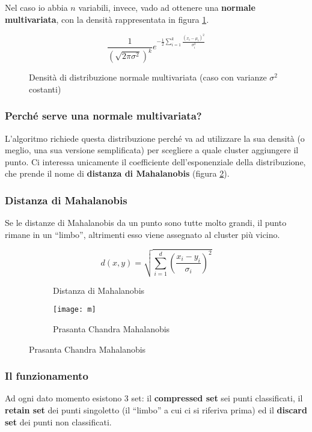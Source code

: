 \documentclass[\main/main.tex]{subfiles}
\begin{document}
Nel caso io abbia $n$ variabili, invece, vado ad ottenere una \textbf{normale multivariata}, con la densità rappresentata in figura \ref{fig:multivariata}.

\begin{figure}
  \[
    \frac{1}{(\sqrt{2 \pi \sigma^2})^k} e^{- \frac{1}{2} \sum_{i=1}^k \frac{(x_i-\mu_i)^2}{\sigma_i^2}}
  \]
  \caption{Densità di distribuzione normale multivariata (caso con varianze $\sigma^2$ costanti)}
  \label{fig:multivariata}
\end{figure}

\subsubsection{Perché serve una normale multivariata?}
L'algoritmo richiede questa distribuzione perché va ad utilizzare la sua densità (o meglio, una sua versione semplificata) per scegliere a quale cluster aggiungere il punto. Ci interessa unicamente il coefficiente dell'esponenziale della distribuzione, che prende il nome di \textbf{distanza di Mahalanobis} (figura \ref{fig:Mahalanobis}).

\subsubsection{Distanza di Mahalanobis}
Se le distanze di Mahalanobis da un punto sono tutte molto grandi, il punto rimane in un ``limbo'', altrimenti esso viene assegnato al cluster più vicino.

\begin{figure}
  \begin{subfigure}{.5\textwidth}
    \[
      d(x,y) = \sqrt{\sum_{i=1}^d \left(\frac{x_i - y_i}{\sigma_i}\right)^2}
    \]
    \caption{Distanza di Mahalanobis}
    \label{fig:Mahalanobis}
  \end{subfigure}%
  \begin{subfigure}{.5\textwidth}
    \centering
    \texttt{[image: m]}
    \caption{Prasanta Chandra Mahalanobis}
  \end{subfigure}
\end{figure}

\subsubsection{Il funzionamento}
Ad ogni dato momento esistono 3 set: il \textbf{compressed set} sei punti classificati, il \textbf{retain set} dei punti singoletto (il ``limbo'' a cui ci si riferiva prima) ed il \textbf{discard set} dei punti non classificati.
\end{document}
